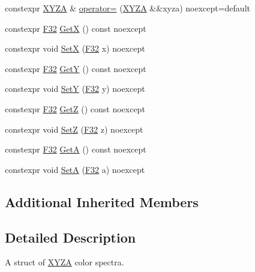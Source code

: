 \begin{DoxyCompactItemize}
constexpr \mbox{\hyperlink{structmage_1_1_x_y_z_a}{X\+Y\+ZA}} \& \mbox{\hyperlink{structmage_1_1_x_y_z_a_a15556bcc4521264fc3edfc1b4f1a595a}{operator=}} (\mbox{\hyperlink{structmage_1_1_x_y_z_a}{X\+Y\+ZA}} \&\&xyza) noexcept=default
\item 
constexpr \mbox{\hyperlink{namespacemage_aa97e833b45f06d60a0a9c4fc22ae02c0}{F32}} \mbox{\hyperlink{structmage_1_1_x_y_z_a_ad8a87f85d80f41961d88657150d62d83}{GetX}} () const noexcept
\item 
constexpr void \mbox{\hyperlink{structmage_1_1_x_y_z_a_ae94002f96c710ac074672736e5f96a53}{SetX}} (\mbox{\hyperlink{namespacemage_aa97e833b45f06d60a0a9c4fc22ae02c0}{F32}} x) noexcept
\item 
constexpr \mbox{\hyperlink{namespacemage_aa97e833b45f06d60a0a9c4fc22ae02c0}{F32}} \mbox{\hyperlink{structmage_1_1_x_y_z_a_a218a44b26cb020ff6ebd730772425097}{GetY}} () const noexcept
\item 
constexpr void \mbox{\hyperlink{structmage_1_1_x_y_z_a_a2e1669b43888849e7b8ecff3619b3f61}{SetY}} (\mbox{\hyperlink{namespacemage_aa97e833b45f06d60a0a9c4fc22ae02c0}{F32}} y) noexcept
\item 
constexpr \mbox{\hyperlink{namespacemage_aa97e833b45f06d60a0a9c4fc22ae02c0}{F32}} \mbox{\hyperlink{structmage_1_1_x_y_z_a_a951b69d9024672c0d59f81e15c9f7f6b}{GetZ}} () const noexcept
\item 
constexpr void \mbox{\hyperlink{structmage_1_1_x_y_z_a_aabbeb3087741702e0d94ec989b516652}{SetZ}} (\mbox{\hyperlink{namespacemage_aa97e833b45f06d60a0a9c4fc22ae02c0}{F32}} z) noexcept
\item 
constexpr \mbox{\hyperlink{namespacemage_aa97e833b45f06d60a0a9c4fc22ae02c0}{F32}} \mbox{\hyperlink{structmage_1_1_x_y_z_a_a97ee3d29d5a8f2b7cd005458fc5a2f25}{GetA}} () const noexcept
\item 
constexpr void \mbox{\hyperlink{structmage_1_1_x_y_z_a_abbf1fe2475252fc2fa62588de5534dee}{SetA}} (\mbox{\hyperlink{namespacemage_aa97e833b45f06d60a0a9c4fc22ae02c0}{F32}} a) noexcept
\end{DoxyCompactItemize}
\subsection*{Additional Inherited Members}


\subsection{Detailed Description}
A struct of \mbox{\hyperlink{structmage_1_1_x_y_z_a}{X\+Y\+ZA}} color spectra. 

